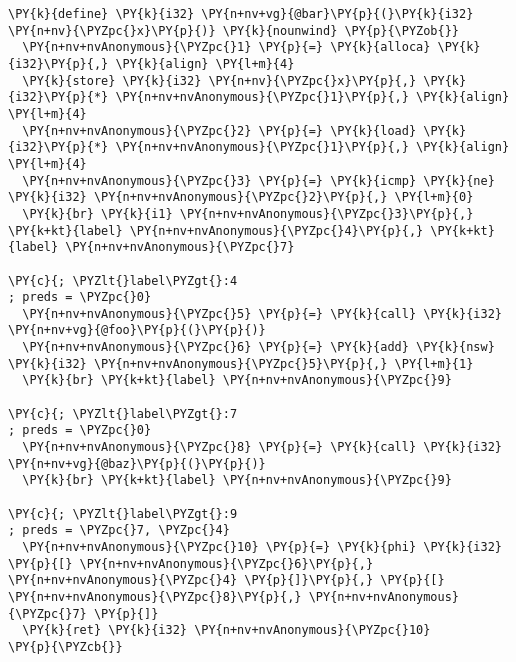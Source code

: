 \begin{Verbatim}[commandchars=\\\{\}]
\PY{k}{define} \PY{k}{i32} \PY{n+nv+vg}{@bar}\PY{p}{(}\PY{k}{i32} \PY{n+nv}{\PYZpc{}x}\PY{p}{)} \PY{k}{nounwind} \PY{p}{\PYZob{}}
  \PY{n+nv+nvAnonymous}{\PYZpc{}1} \PY{p}{=} \PY{k}{alloca} \PY{k}{i32}\PY{p}{,} \PY{k}{align} \PY{l+m}{4}
  \PY{k}{store} \PY{k}{i32} \PY{n+nv}{\PYZpc{}x}\PY{p}{,} \PY{k}{i32}\PY{p}{*} \PY{n+nv+nvAnonymous}{\PYZpc{}1}\PY{p}{,} \PY{k}{align} \PY{l+m}{4}
  \PY{n+nv+nvAnonymous}{\PYZpc{}2} \PY{p}{=} \PY{k}{load} \PY{k}{i32}\PY{p}{*} \PY{n+nv+nvAnonymous}{\PYZpc{}1}\PY{p}{,} \PY{k}{align} \PY{l+m}{4}
  \PY{n+nv+nvAnonymous}{\PYZpc{}3} \PY{p}{=} \PY{k}{icmp} \PY{k}{ne} \PY{k}{i32} \PY{n+nv+nvAnonymous}{\PYZpc{}2}\PY{p}{,} \PY{l+m}{0}
  \PY{k}{br} \PY{k}{i1} \PY{n+nv+nvAnonymous}{\PYZpc{}3}\PY{p}{,} \PY{k+kt}{label} \PY{n+nv+nvAnonymous}{\PYZpc{}4}\PY{p}{,} \PY{k+kt}{label} \PY{n+nv+nvAnonymous}{\PYZpc{}7}

\PY{c}{; \PYZlt{}label\PYZgt{}:4                                       ; preds = \PYZpc{}0}
  \PY{n+nv+nvAnonymous}{\PYZpc{}5} \PY{p}{=} \PY{k}{call} \PY{k}{i32} \PY{n+nv+vg}{@foo}\PY{p}{(}\PY{p}{)}
  \PY{n+nv+nvAnonymous}{\PYZpc{}6} \PY{p}{=} \PY{k}{add} \PY{k}{nsw} \PY{k}{i32} \PY{n+nv+nvAnonymous}{\PYZpc{}5}\PY{p}{,} \PY{l+m}{1}
  \PY{k}{br} \PY{k+kt}{label} \PY{n+nv+nvAnonymous}{\PYZpc{}9}

\PY{c}{; \PYZlt{}label\PYZgt{}:7                                       ; preds = \PYZpc{}0}
  \PY{n+nv+nvAnonymous}{\PYZpc{}8} \PY{p}{=} \PY{k}{call} \PY{k}{i32} \PY{n+nv+vg}{@baz}\PY{p}{(}\PY{p}{)}
  \PY{k}{br} \PY{k+kt}{label} \PY{n+nv+nvAnonymous}{\PYZpc{}9}

\PY{c}{; \PYZlt{}label\PYZgt{}:9                                       ; preds = \PYZpc{}7, \PYZpc{}4}
  \PY{n+nv+nvAnonymous}{\PYZpc{}10} \PY{p}{=} \PY{k}{phi} \PY{k}{i32} \PY{p}{[} \PY{n+nv+nvAnonymous}{\PYZpc{}6}\PY{p}{,} \PY{n+nv+nvAnonymous}{\PYZpc{}4} \PY{p}{]}\PY{p}{,} \PY{p}{[} \PY{n+nv+nvAnonymous}{\PYZpc{}8}\PY{p}{,} \PY{n+nv+nvAnonymous}{\PYZpc{}7} \PY{p}{]}
  \PY{k}{ret} \PY{k}{i32} \PY{n+nv+nvAnonymous}{\PYZpc{}10}
\PY{p}{\PYZcb{}}
\end{Verbatim}
